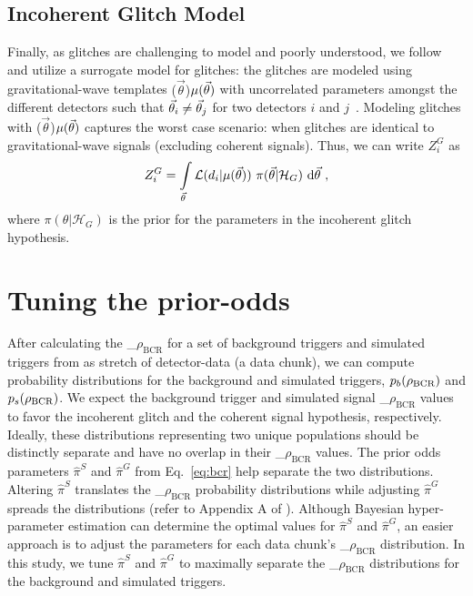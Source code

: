 \documentclass[%
 nofootinbib,
 amsmath,amssymb,
 aps,
 twocolumn,
 superscriptaddress
]{revtex4-2}
\newcommand{\mathcmd}[1]{{\sc \relax\ifmmode#1\else $#1$\fi}\xspace}
\newcommand{\bcr}{\mathcmd{\rho_\text{BCR}}}
\newcommand{\parameters}{\mathcmd{\vec{\theta}}}
\newcommand{\template}{\mathcmd{\mu(\parameters)}}
\begin{document}
\subsection{Incoherent Glitch Model}
Finally, as glitches are challenging to model and poorly understood, we follow \citet{bci} and utilize a surrogate model for glitches: the glitches are modeled using gravitational-wave templates  \template with uncorrelated  parameters amongst the different detectors such that  $\parameters_i \neq \parameters_j$ for two detectors $i$ and $j$~\cite{bci}.  Modeling glitches with \template captures the worst case scenario: when glitches are identical to gravitational-wave signals (excluding coherent signals). Thus, we can write $Z^G_i$ as 
\begin{equation}
\label{eq:zg}
Z^G_i = \int\limits_{\parameters} \mathcal{L}(d_i|\template)\ \pi(\parameters| \mathcal{H}_G)\  \text{d}\parameters  \ ,
\end{equation}
where $\pi(\theta| \mathcal{H}_G)$ is the prior for the parameters in the incoherent glitch hypothesis. 



\section{Tuning the prior-odds}\label{apdx:tuning-prior-odds}

After calculating the \bcr for a set of background triggers and simulated triggers from as stretch of detector-data (a data chunk), we can compute probability distributions for the background and simulated triggers, $p_b(\bcr)$ and $p_s(\bcr)$. We expect the background trigger and simulated signal \bcr values to favor the incoherent glitch and the coherent signal hypothesis, respectively. Ideally, these distributions representing two unique populations should be distinctly separate and have no overlap in their \bcr values. The prior odds parameters $\hat{\pi}^S$ and $\hat{\pi}^G$ from Eq.~\ref{eq:bcr} help separate the two distributions. Altering $\hat{\pi}^S$ translates the \bcr probability distributions while adjusting $\hat{\pi}^G$ spreads the distributions (refer to Appendix A of \citet{BCR1}). Although Bayesian hyper-parameter estimation can determine the optimal values for $\hat{\pi}^S$ and $\hat{\pi}^G$, an easier approach is to adjust the parameters for each data chunk's \bcr distribution. In this study, we tune $\hat{\pi}^S$ and $\hat{\pi}^G$ to maximally separate the \bcr distributions for the background and simulated triggers. 
\end{document}
